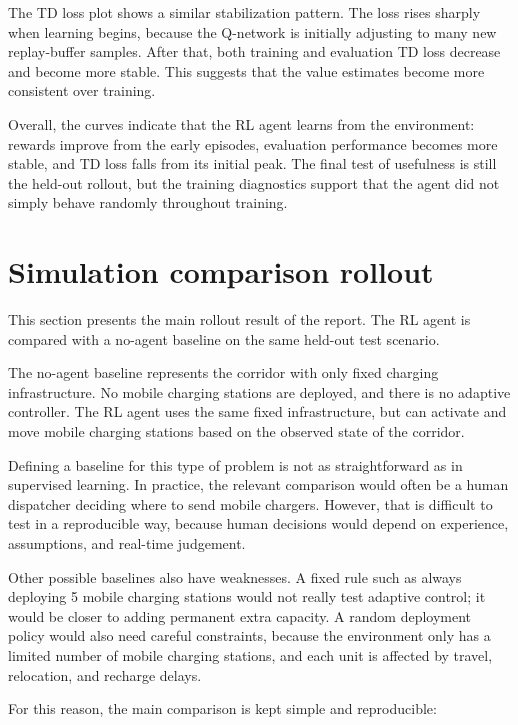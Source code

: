 \documentclass[11pt]{article}
\begin{document}
The TD loss plot shows a similar stabilization pattern. The loss rises
sharply when learning begins, because the Q-network is initially
adjusting to many new replay-buffer samples. After that, both training
and evaluation TD loss decrease and become more stable. This suggests
that the value estimates become more consistent over training.

Overall, the curves indicate that the RL agent learns from the
environment: rewards improve from the early episodes, evaluation
performance becomes more stable, and TD loss falls from its initial
peak. The final test of usefulness is still the held-out rollout, but
the training diagnostics support that the agent did not simply behave
randomly throughout training.

    \hypertarget{toc-simulation-comparison-rollout}{}
    \section{Simulation comparison
rollout}\label{simulation-comparison-rollout}

This section presents the main rollout result of the report. The RL
agent is compared with a no-agent baseline on the same held-out test
scenario.

The no-agent baseline represents the corridor with only fixed charging
infrastructure. No mobile charging stations are deployed, and there is
no adaptive controller. The RL agent uses the same fixed infrastructure,
but can activate and move mobile charging stations based on the observed
state of the corridor.

Defining a baseline for this type of problem is not as straightforward
as in supervised learning. In practice, the relevant comparison would
often be a human dispatcher deciding where to send mobile chargers.
However, that is difficult to test in a reproducible way, because human
decisions would depend on experience, assumptions, and real-time
judgement.

Other possible baselines also have weaknesses. A fixed rule such as
always deploying 5 mobile charging stations would not really test
adaptive control; it would be closer to adding permanent extra capacity.
A random deployment policy would also need careful constraints, because
the environment only has a limited number of mobile charging stations,
and each unit is affected by travel, relocation, and recharge delays.

For this reason, the main comparison is kept simple and reproducible:
\end{document}

